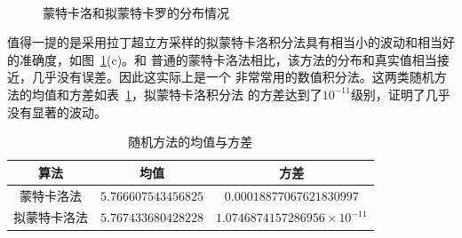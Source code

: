 \documentclass[a4paper,twoside]{article}
\begin{document}
\begin{spacing}{1.2}
\begin{figure}[H]
	\centering 
	~
	~ 
	\caption{蒙特卡洛和拟蒙特卡罗的分布情况} 
	\label{fig:variance}
\end{figure}

值得一提的是采用拉丁超立方采样的拟蒙特卡洛积分法具有相当小的波动和相当好的准确度，如图~\ref{fig:variance}(c)。和
普通的蒙特卡洛法相比，该方法的分布和真实值相当接近，几乎没有误差。因此这实际上是一个
非常常用的数值积分法。这两类随机方法的均值和方差如表~\ref{tbl:var}，拟蒙特卡洛积分法
的方差达到了$10^{-11}$级别，证明了几乎没有显著的波动。


\begin{table}[htbp]
	\centering
	\begin{tabular}{ccc}
		\toprule
		算法 & 均值 & 方差 \\
		\midrule
		蒙特卡洛法 & $5.766607543456825$ & $0.00018877067621830997$ \\
		拟蒙特卡洛法 & $5.767433680428228$ & $1.0746874157286956\times 10^{-11}$ \\
		\bottomrule
	\end{tabular}
	\label{tbl:var}
	\caption{随机方法的均值与方差}
\end{table}


\end{spacing}
\end{document}
